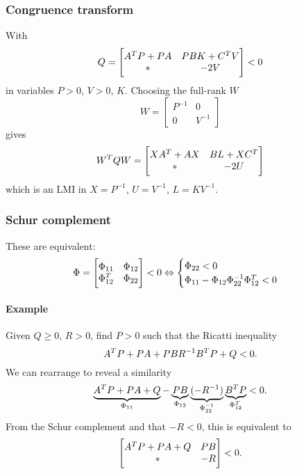 \subsubsection{Congruence transform}
With
%
\begin{equation}
  Q =
  \begin{bmatrix}
    A^{T} P + PA & PBK + C^{T} V \\
    * & -2V
  \end{bmatrix}
  < 0
\end{equation}
%
in variables $P>0$, $V>0$, $K$. Choosing the full-rank $W$
%
\begin{equation}
  W =
  \begin{bmatrix}
    P^{-1} & 0 \\
    0 & V^{-1}
  \end{bmatrix}
\end{equation}
%
gives
%
\begin{equation}
  W^{T} Q W =
  \begin{bmatrix}
    XA^{T} + AX & BL + XC^{T} \\
    * & -2U
  \end{bmatrix}
\end{equation}
%
which is an LMI in $X = P^{-1}$, $U = V^{-1}$, $L = KV^{-1}$.

\subsubsection{Schur complement}
These are equivalent:
%
\begin{equation}
  \Phi =
  \begin{bmatrix}
    \Phi_{11} & \Phi_{12} \\
    \Phi_{12}^{T} & \Phi_{22}
  \end{bmatrix}
  < 0
  \Leftrightarrow
  \begin{cases}
    \Phi_{22} < 0 \\
    \Phi_{11} - \Phi_{12} \Phi_{22}^{-1} \Phi_{12}^{T} < 0
  \end{cases}
\end{equation}

\paragraph{Example} Given $Q \geq 0$, $R > 0$, find $P > 0$ such that the Ricatti inequality
%
\begin{equation}
  A^{T} P + PA + PBR^{-1}B^{T} P + Q < 0.
\end{equation}
%
We can rearrange to reveal a similarity
%
\begin{equation}
  \underbrace{A^{T} P + PA + Q}_{\Phi_{11}}
  -
  \underbrace{PB}_{\Phi_{12}}
  \underbrace{(-R^{-1})}_{\Phi_{22}^{-1}}
  \underbrace{B^{T} P}_{\Phi_{12}^{T}}
  < 0.
\end{equation}
%
From the Schur complement and that $-R < 0$, this is equivalent to
%
\begin{equation}
  \begin{bmatrix}
    A^{T} P + PA + Q & PB \\
    * & -R
  \end{bmatrix}
  < 0.
\end{equation}

